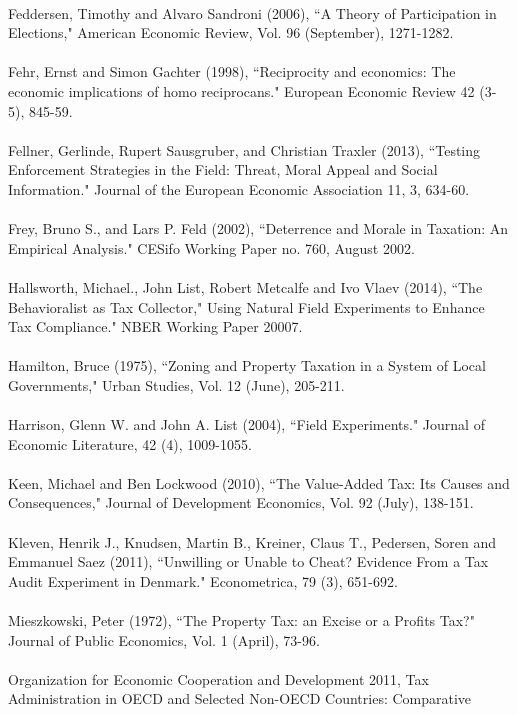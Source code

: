 \documentclass[12pt,titlepage]{article}
\begin{document}
\\ 
Feddersen, Timothy and Alvaro Sandroni (2006), ``A Theory of
Participation in Elections," American Economic Review, Vol. 96
(September), 1271-1282.  \\ 
\\ 
Fehr, Ernst and Simon Gachter (1998), ``Reciprocity and economics: The
economic implications of homo reciprocans." European Economic Review
42 (3-5), 845-59. \\ 
\\ 
Fellner, Gerlinde, Rupert Sausgruber, and Christian Traxler (2013),
``Testing Enforcement Strategies in the Field: Threat, Moral Appeal
and Social Information." Journal of the European Economic Association
11, 3, 634-60.\\ 
\\ 
Frey, Bruno S., and Lars P. Feld (2002), ``Deterrence and Morale in
Taxation: An Empirical Analysis."  CESifo Working Paper no. 760,
August 2002. \\ 
\\ 
Hallsworth, Michael., John List, Robert Metcalfe and Ivo Vlaev (2014),
``The Behavioralist as Tax Collector," Using Natural Field Experiments
to Enhance Tax Compliance." NBER Working Paper 20007. \\ 
\\ 
Hamilton, Bruce (1975), ``Zoning and Property Taxation in a System of
Local Governments," Urban Studies, Vol. 12 (June),
205-211. \\ 
\\ 
Harrison, Glenn W. and John A. List (2004), ``Field Experiments."
Journal of Economic Literature, 42 (4), 1009-1055.\\ 
\\ 
Keen, Michael and Ben Lockwood (2010), ``The Value-Added Tax: Its
Causes and Consequences," Journal of Development Economics, Vol. 92
(July), 138-151. \\ 
\\ 
Kleven, Henrik J., Knudsen, Martin B., Kreiner, Claus T., Pedersen,
Soren and Emmanuel Saez (2011), ``Unwilling or Unable to Cheat?
Evidence From a Tax Audit Experiment in Denmark."  Econometrica, 79
(3), 651-692. \\ 
\\ 
Mieszkowski, Peter (1972), ``The Property Tax: an Excise or a Profits
Tax?" Journal of Public Economics, Vol. 1 (April),
73-96. \\ 
\\ 
Organization for Economic Cooperation and Development 2011, Tax
Administration in OECD and Selected Non-OECD Countries: Comparative
\end{document}
